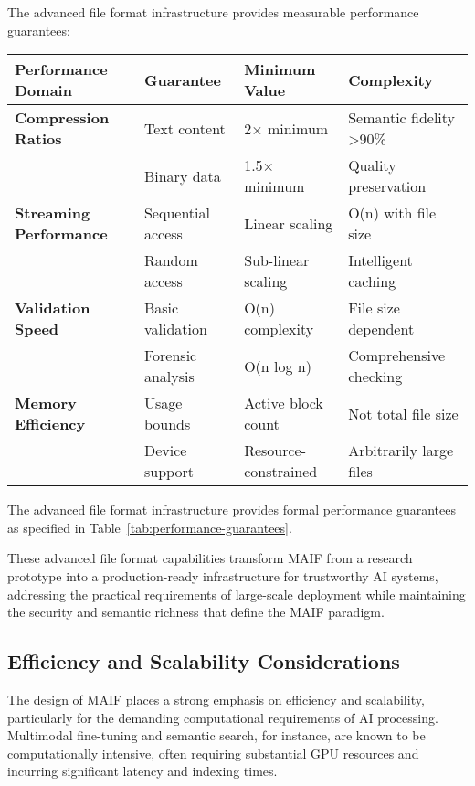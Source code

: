\documentclass[conference]{IEEEtran}
\begin{document}
The advanced file format infrastructure provides measurable performance guarantees:

\begin{table*}[!t]
\renewcommand{\arraystretch}{1.3}
\caption{MAIF Formal Performance Guarantees and Complexity Analysis}
\label{tab:performance-guarantees}
\centering
\footnotesize
\begin{tabular}{p{3.5cm}p{4cm}p{3cm}p{3.5cm}}
\toprule
\textbf{Performance Domain} & \textbf{Guarantee} & \textbf{Minimum Value} & \textbf{Complexity} \\
\midrule
\textbf{Compression Ratios} & Text content & 2× minimum & Semantic fidelity >90\% \\
& Binary data & 1.5× minimum & Quality preservation \\
\midrule
\textbf{Streaming Performance} & Sequential access & Linear scaling & O(n) with file size \\
& Random access & Sub-linear scaling & Intelligent caching \\
\midrule
\textbf{Validation Speed} & Basic validation & O(n) complexity & File size dependent \\
& Forensic analysis & O(n log n) & Comprehensive checking \\
\midrule
\textbf{Memory Efficiency} & Usage bounds & Active block count & Not total file size \\
& Device support & Resource-constrained & Arbitrarily large files \\
\bottomrule
\end{tabular}
\end{table*}

The advanced file format infrastructure provides formal performance guarantees as specified in Table~\ref{tab:performance-guarantees}.

These advanced file format capabilities transform MAIF from a research prototype into a production-ready infrastructure for trustworthy AI systems, addressing the practical requirements of large-scale deployment while maintaining the security and semantic richness that define the MAIF paradigm.

\subsection{Efficiency and Scalability Considerations}

The design of MAIF places a strong emphasis on efficiency and scalability, particularly for the demanding computational requirements of AI processing. Multimodal fine-tuning and semantic search, for instance, are known to be computationally intensive, often requiring substantial GPU resources and incurring significant latency and indexing times\cite{ref79}.
\end{document}
